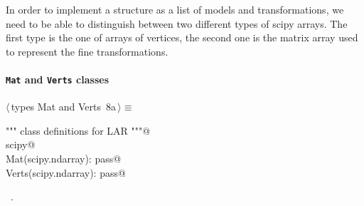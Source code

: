\documentclass[11pt,oneside]{article}	%
\begin{document}
In order to implement a structure as a list of models and transformations, we need to be able to distinguish between two different types of scipy arrays. The first type is the one of arrays of vertices, the second one is the matrix array used to represent the fine transformations.

\paragraph{\texttt{Mat} and \texttt{Verts} classes}
\begin{flushleft} \small \label{scrap22}
\protect{}$\langle\,$types Mat and Verts\nobreak\ {\footnotesize 8a}$\,\rangle\equiv$
\vspace{-1ex}
\begin{list}{}{} \item
\mbox{}\verb@""" class definitions for LAR """@\\
\mbox{}\verb@import scipy@\\
\mbox{}\verb@class Mat(scipy.ndarray): pass@\\
\mbox{}\verb@class Verts(scipy.ndarray): pass@\\
\mbox{}\verb@@{\NWsep}
\end{list}
\vspace{-1ex}
\footnotesize\addtolength{\baselineskip}{-1ex}
\begin{list}{}{\setlength{\itemsep}{-\parsep}\setlength{\itemindent}{-\leftmargin}}
\item \NWtxtMacroRefIn\ .
\end{list}
\end{flushleft}
\end{document}
